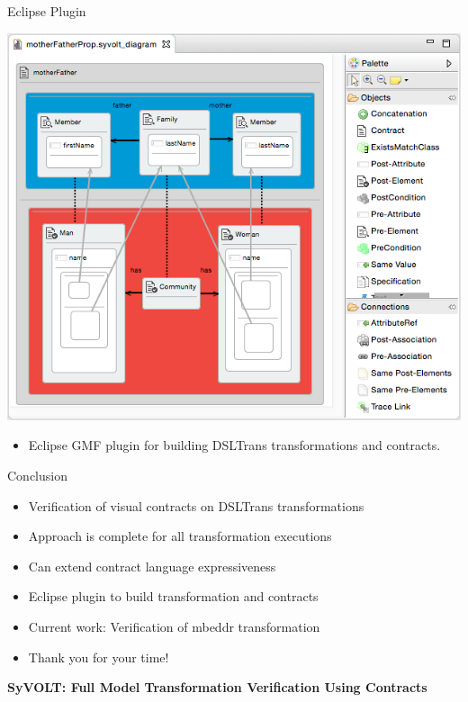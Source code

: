 \documentclass[xcolor=dvipsnames, 12pt, handout]{beamer}
\begin{document}
\begin{frame}{Eclipse Plugin}
\begin{center}
\includegraphics[height=0.8\textheight]{figures/eclipse_frontend}
\end{center}

\begin{itemize}
\item Eclipse GMF plugin for building DSLTrans transformations and contracts.
\end{itemize}
\end{frame}

\begin{frame}{Conclusion}
\begin{itemize}[<+->]
\item Verification of visual contracts on DSLTrans transformations
\item Approach is complete for all transformation executions
\item Can extend contract language expressiveness
\item Eclipse plugin to build transformation and contracts
\item Current work: Verification of mbeddr transformation
\end{itemize}
\pause
\begin{itemize}
\item Thank you for your time!
\end{itemize}
\begin{center}
\textbf{SyVOLT: Full Model Transformation Verification Using Contracts}\\
\end{center}
\end{frame}
\end{document}
